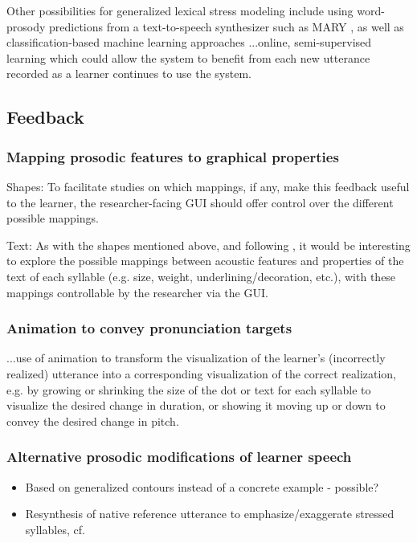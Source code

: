 	 Other possibilities for generalized lexical stress modeling include using word-prosody predictions from a text-to-speech synthesizer such as MARY \citep{Schroeder2003}, as well as 
classification-based machine learning approaches 
   ...online, semi-supervised learning which could allow the system to benefit from each new utterance recorded as a learner continues to use the system.
	


	\subsection{Feedback}
	
	\subsubsection{Mapping prosodic features to graphical properties}
	Shapes: To facilitate studies on which mappings, if any, make this feedback useful to the learner, the researcher-facing GUI should offer control over the different possible mappings.
	
	Text: As with the shapes mentioned above, and following \textcite{Sitaram2011}, it would be interesting to explore the possible mappings between acoustic features and properties of the text of each syllable (e.g. size, weight, underlining/decoration, etc.), with these mappings controllable by the researcher via the GUI.
	
	\subsubsection{Animation to convey pronunciation targets}
	...use of animation to transform the visualization of the learner's (incorrectly realized) utterance into a corresponding visualization of the correct realization, e.g. by growing or shrinking the size of the dot or text for each syllable to visualize the desired change in duration, or showing it moving up or down to convey the desired change in pitch.
	
	\subsubsection{Alternative prosodic modifications of learner speech}
	
	\begin{itemize}
	\item{Based on generalized contours instead of a concrete example - possible?}
	\item{Resynthesis of native reference utterance to emphasize/exaggerate stressed syllables, cf. \citep{Bissiri2006,Bissiri2009}}
	\end{itemize}